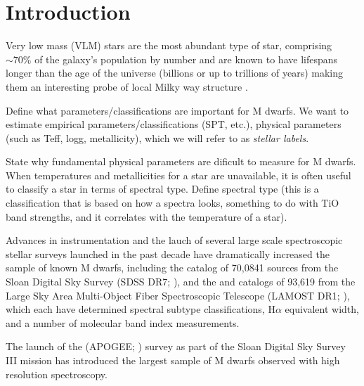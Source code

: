 \documentclass[preprint]{aastex62}
\begin{document}
 
\section{Introduction} \label{sec:intro}

Very low mass (VLM) stars are the most abundant type of star, comprising $\sim 70 \%$ of the galaxy's population by number \citep{Bochanski:2010} and are known to have lifespans longer than the age of the universe (billions or up to trillions of years) \citep{Laughlin:1997} making them an interesting probe of local Milky way structure \citep{Bochanski:2007}. 

Define what parameters/classifications are important for M dwarfs. We want to estimate empirical parameters/classifications (SPT, etc.), physical parameters (such as Teff, logg, metallicity), which we will refer to as \emph{stellar labels}. 

State why fundamental physical parameters are dificult to measure for M dwarfs. When temperatures and metallicities for a star are unavailable, it is often useful to classify a star in terms of spectral type. Define spectral type (this is a classification that is based on how a spectra looks, something to do with TiO band strengths, and it correlates with the temperature of a star). 

Advances in instrumentation and the lauch of several large scale spectroscopic stellar surveys launched in the past decade have dramatically increased the sample of known M dwarfs, including the \citealt{West:2011} catalog of 70,0841 sources from the Sloan Digital Sky Survey (SDSS DR7; \citealt{Abazajian:2009}), and the \citealt{Yi:2014} and \citealt{Guo:2015} catalogs of 93,619 from the Large Sky Area Multi-Object Fiber Spectroscopic Telescope (LAMOST DR1; \citealt{Zhao:2012}), which each have determined spectral subtype classifications, H$\alpha$ equivalent width, and a number of molecular band index measurements. 

The launch of the (APOGEE; \citealt{Majewski:2015}) survey as part of the Sloan Digital Sky Survey III mission \citealt{Eisenstein:2011} has introduced the largest sample of M dwarfs observed with high resolution spectroscopy. \color{gcolor}{What about APOGEE's wavelength coverage, resolution, selection and other specs allow us to do things with M dwarfs that other surveys/instruments can't?}\color{black}
\end{document}
